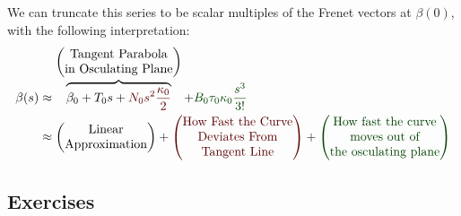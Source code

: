 \M
We can truncate this series to be scalar multiples of the Frenet vectors
at $\beta(0)$, with the following interpretation:
\begin{equation}
  \begin{split}
  \beta(s)&\approx
  \overbrace{\beta_{0} +T_{0} s
+{\color{DarkRed}N_{0}s^{2}\frac{\kappa_{0}}{2}}}^{\begin{pmatrix}\mbox{Tangent Parabola}\\
\mbox{in Osculating Plane}
\end{pmatrix}}
+{\color{DarkGreen}B_{0}\tau_{0}\kappa_{0}\frac{s^{3}}{3!}}\\
&\approx\begin{pmatrix}
  \mbox{Linear}\\
  \mbox{Approximation}
\end{pmatrix}
+{\color{DarkRed}\begin{pmatrix}
    \mbox{How Fast the Curve}\\
    \mbox{Deviates From}\\
    \mbox{Tangent Line}
\end{pmatrix}}
+{\color{DarkGreen}\begin{pmatrix}\mbox{How fast the curve}\\
  \mbox{moves out of}\\
  \mbox{the osculating plane}
\end{pmatrix}}
  \end{split}
\end{equation}
\vfill\eject

\subsection*{Exercises}





